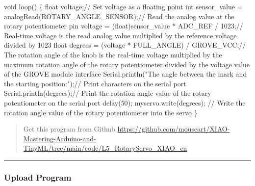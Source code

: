 \documentclass[
  letterpaper,
  DIV=11,
  numbers=noendperiod]{scrreprt}
\newenvironment{Shaded}{\begin{snugshade}}{\end{snugshade}}
\newcommand{\CommentTok}[1]{\textcolor[rgb]{0.37,0.37,0.37}{#1}}
\newcommand{\DataTypeTok}[1]{\textcolor[rgb]{0.68,0.00,0.00}{#1}}
\newcommand{\DecValTok}[1]{\textcolor[rgb]{0.68,0.00,0.00}{#1}}
\newcommand{\NormalTok}[1]{\textcolor[rgb]{0.00,0.23,0.31}{#1}}
\newcommand{\OperatorTok}[1]{\textcolor[rgb]{0.37,0.37,0.37}{#1}}
\newcommand{\StringTok}[1]{\textcolor[rgb]{0.13,0.47,0.30}{#1}}
\begin{document}
\begin{Shaded}
\begin{Highlighting}[]
\DataTypeTok{void}\NormalTok{ loop}\OperatorTok{()} \OperatorTok{\{}
    \DataTypeTok{float}\NormalTok{ voltage}\OperatorTok{;}\CommentTok{// Set voltage as a floating point}
    \DataTypeTok{int}\NormalTok{ sensor\_value }\OperatorTok{=}\NormalTok{ analogRead}\OperatorTok{(}\NormalTok{ROTARY\_ANGLE\_SENSOR}\OperatorTok{);}\CommentTok{// Read the analog value at the rotary potentiometer pin}
\NormalTok{    voltage }\OperatorTok{=} \OperatorTok{(}\DataTypeTok{float}\OperatorTok{)}\NormalTok{sensor\_value }\OperatorTok{*}\NormalTok{ ADC\_REF }\OperatorTok{/} \DecValTok{1023}\OperatorTok{;}\CommentTok{// Real{-}time voltage is the read analog value multiplied by the reference voltage divided by 1023}
    \DataTypeTok{float}\NormalTok{ degrees }\OperatorTok{=} \OperatorTok{(}\NormalTok{voltage }\OperatorTok{*}\NormalTok{ FULL\_ANGLE}\OperatorTok{)} \OperatorTok{/}\NormalTok{ GROVE\_VCC}\OperatorTok{;}\CommentTok{// The rotation angle of the knob is the real{-}time voltage multiplied by the maximum rotation angle of the rotary potentiometer divided by the voltage value of the GROVE module interface}
\NormalTok{    Serial}\OperatorTok{.}\NormalTok{println}\OperatorTok{(}\StringTok{"The angle between the mark and the starting position:"}\OperatorTok{);}\CommentTok{// Print characters on the serial port}
\NormalTok{    Serial}\OperatorTok{.}\NormalTok{println}\OperatorTok{(}\NormalTok{degrees}\OperatorTok{);}\CommentTok{// Print the rotation angle value of the rotary potentiometer on the serial port}
\NormalTok{    delay}\OperatorTok{(}\DecValTok{50}\OperatorTok{);}
\NormalTok{    myservo}\OperatorTok{.}\NormalTok{write}\OperatorTok{(}\NormalTok{degrees}\OperatorTok{);} \CommentTok{// Write the rotation angle value of the rotary potentiometer into the servo}
\OperatorTok{\}}
\end{Highlighting}
\end{Shaded}

\begin{quote}
Get this program from Github
\url{https://github.com/mouseart/XIAO-Mastering-Arduino-and-TinyML/tree/main/code/L5_RotaryServo_XIAO_en}
\end{quote}

\begin{center}\rule{0.5\linewidth}{0.5pt}\end{center}

\hypertarget{upload-program}{%
\subsubsection*{Upload Program}\label{upload-program}}
\end{document}
